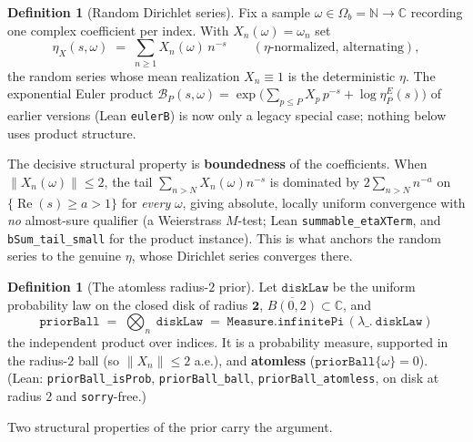 \documentclass[11pt,a4paper]{article}
\theoremstyle{definition}
\newtheorem{definition}[theorem]{Definition}
\newcommand{\Rea}{\operatorname{Re}}
\newcommand{\etaX}{\eta_X}
\begin{document}
\begin{definition}[Random Dirichlet series]\label{def:series}
Fix a sample \(\omega\in\Omega_b=\mathbb{N}\to\mathbb{C}\) recording one complex
coefficient per index. With \(X_n(\omega)=\omega_n\) set
\[
  \etaX(s,\omega) \;=\; \sum_{n\ge 1} X_n(\omega)\,n^{-s}
  \qquad(\eta\text{-normalized, alternating}),
\]
the random series whose mean realization \(X_n\equiv1\) is the deterministic \(\eta\). The
exponential Euler product \(\mathcal{B}_P(s,\omega)=\exp\bigl(\sum_{p\le P}X_p\,p^{-s}
+\log\eta^E_P(s)\bigr)\) of earlier versions (Lean \texttt{eulerB}) is now only a legacy
special case; nothing below uses product structure.
\end{definition}

The decisive structural property is \textbf{boundedness} of the coefficients. When
\(\|X_n(\omega)\|\le 2\), the tail \(\sum_{n>N}X_n(\omega)n^{-s}\) is dominated by
\(2\sum_{n>N}n^{-a}\) on \(\{\Rea(s)\ge a>1\}\) for \emph{every} \(\omega\), giving absolute,
locally uniform convergence with \emph{no} almost-sure qualifier (a Weierstrass \(M\)-test; Lean
\texttt{summable\_etaXTerm}, and \texttt{bSum\_tail\_small} for the product instance). This is
what anchors the random series to the genuine \(\eta\), whose Dirichlet series converges there.

\begin{definition}[The atomless radius-\(2\) prior]\label{def:prior}
Let \(\texttt{diskLaw}\) be the uniform probability law on the closed disk of radius
\(\mathbf{2}\), \(\overline{B(0,2)}\subset\mathbb{C}\), and
\[
  \texttt{priorBall} \;=\; \bigotimes_{n}\ \texttt{diskLaw}
  \;=\; \texttt{Measure.infinitePi}\,(\lambda\_.\ \texttt{diskLaw})
\]
the independent product over indices. It is a probability measure, supported in the
radius-\(2\) ball (so \(\|X_n\|\le 2\) a.e.), and \textbf{atomless}
(\(\texttt{priorBall}\{\omega\}=0\)). (Lean: \texttt{priorBall\_isProb},
\texttt{priorBall\_ball}, \texttt{priorBall\_atomless}, on disk at radius \(2\) and
\texttt{sorry}-free.)
\end{definition}

Two structural properties of the prior carry the argument.
\end{document}
